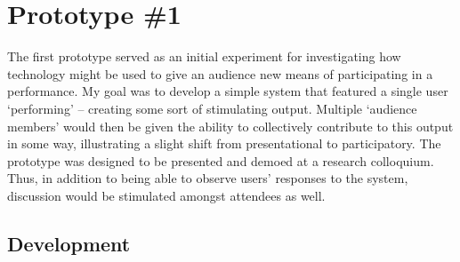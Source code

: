 
\section{Prototype \#1}

The first prototype served as an initial experiment for investigating how technology might be used to give an audience new means of participating in a performance. My goal was to develop a simple system that featured a single user `performing' -- creating some sort of stimulating output. Multiple `audience members' would then be given the ability to collectively contribute to this output in some way, illustrating a slight shift from presentational to participatory. The prototype was designed to be presented and demoed at a research colloquium. Thus, in addition to being able to observe users' responses to the system, discussion would be stimulated amongst attendees as well.


\subsection{Development}

